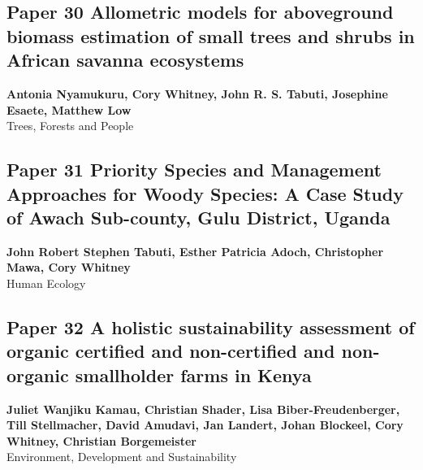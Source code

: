\documentclass[
]{article}
\begin{document}
\newpage

\hypertarget{nyamukuru_allometric_2023}{%
\subsection{Paper 30 Allometric models for aboveground biomass
estimation of small trees and shrubs in African savanna
ecosystems}\label{nyamukuru_allometric_2023}}

\begin{center}
\vspace*{2cm}
{\Large \textbf{Antonia Nyamukuru, Cory Whitney, John R. S. Tabuti, Josephine Esaete, Matthew Low}} \\[0.5cm]
\vspace*{1cm}
{\Large Trees, Forests and People} \\[2cm]
\end{center}


\newpage

\hypertarget{tabuti_priority_2022}{%
\subsection{Paper 31 Priority Species and Management Approaches for
Woody Species: A Case Study of Awach Sub-county, Gulu District,
Uganda}\label{tabuti_priority_2022}}

\begin{center}
\vspace*{2cm}
{\Large \textbf{John Robert Stephen Tabuti, Esther Patricia Adoch, Christopher Mawa, Cory Whitney}} \\[0.5cm]
\vspace*{1cm}
{\Large Human Ecology} \\[2cm]
\end{center}


\newpage

\hypertarget{kamau_holistic_2021}{%
\subsection{Paper 32 A holistic sustainability assessment of organic
certified and non-certified and non-organic smallholder farms in
Kenya}\label{kamau_holistic_2021}}

\begin{center}
\vspace*{2cm}
{\Large \textbf{Juliet Wanjiku Kamau, Christian Shader, Lisa Biber‐Freudenberger, Till Stellmacher, David Amudavi, Jan Landert, Johan Blockeel, Cory Whitney, Christian Borgemeister}} \\[0.5cm]
\vspace*{1cm}
{\Large Environment, Development and Sustainability} \\[2cm]
\end{center}

\end{document}
